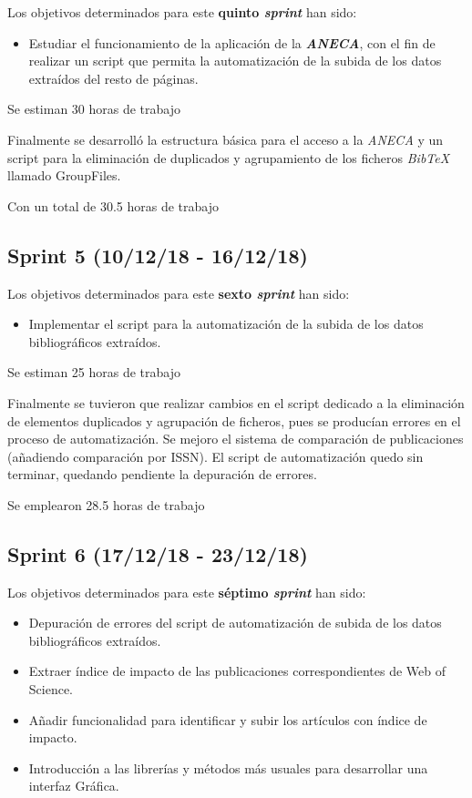 Los objetivos determinados para este \textbf{quinto \emph{sprint}} han sido:
\begin{itemize}
	\item Estudiar el funcionamiento de la aplicación de la \textbf{\emph{ANECA}}, con el fin de realizar un script que permita la automatización de la subida de los datos extraídos del resto de páginas.
\end{itemize}

Se estiman 30 horas de trabajo

Finalmente se desarrolló la estructura básica para el acceso a la \emph{ANECA} y un script para la eliminación de duplicados y agrupamiento de los ficheros \emph{BibTeX} llamado GroupFiles. 

Con un total de 30.5 horas de trabajo
\subsection{Sprint 5 (10/12/18 - 16/12/18)}

Los objetivos determinados para este \textbf{sexto \emph{sprint}} han sido:
\begin{itemize}
	\item Implementar el script para la automatización de la subida de los datos bibliográficos extraídos.
\end{itemize}

Se estiman 25 horas de trabajo

Finalmente se tuvieron que realizar cambios en el script dedicado a la eliminación de elementos duplicados
y agrupación de ficheros, pues se producían errores en el proceso de automatización. Se mejoro el sistema de comparación de publicaciones (añadiendo comparación por ISSN).
El script de automatización quedo sin terminar, quedando pendiente la depuración de errores.


Se emplearon 28.5 horas de trabajo
\subsection{Sprint 6 (17/12/18 - 23/12/18)}
Los objetivos determinados para este \textbf{séptimo \emph{sprint}} han sido:
\begin{itemize}
	\item Depuración de errores del script de automatización de subida de los datos bibliográficos extraídos.
	\item Extraer índice de impacto de las publicaciones correspondientes de Web of Science.
	\item Añadir funcionalidad para identificar y subir los artículos con índice de impacto.
	\item Introducción a las librerías y métodos más usuales para desarrollar una interfaz Gráfica.
\end{itemize}

